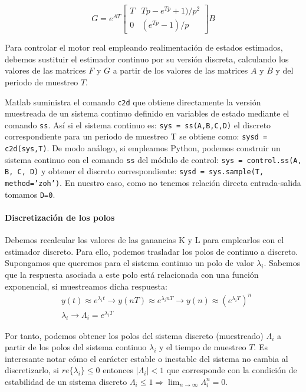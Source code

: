 \documentclass[10pt,a4paper]{report}
\begin{document}
\begin{equation}
	G = e^{AT}\begin{bmatrix}
		T & Tp-e^{Tp}+1)/p^2\\
		0 &(e^{Tp}-1)/p
	\end{bmatrix}B
\end{equation}



Para controlar el motor real empleando realimentación de estados estimados, debemos sustituir el estimador continuo por su versión discreta, calculando los valores de las matrices $F$ y $G$ a partir de los valores de las matrices $A$ y $B$ y del periodo de muestreo $T$. 

Matlab suministra el comando \texttt{c2d} que obtiene directamente la versión muestreada de un sistema continuo definido en variables de estado mediante el comando \texttt{ss}. Así si el sistema continuo es: \texttt{sys = ss(A,B,C,D)} el discreto correspondiente para un periodo de muestreo T se obtiene como: \texttt{sysd = c2d(sys,T)}. De modo análogo, si empleamos Python, podemos construir un sistema continuo con el comando \texttt{ss} del módulo de control: \texttt{sys = control.ss(A, B, C, D)} y obtener el discreto correspondiente: \texttt{sysd = sys.sample(T, method='zoh')}. En nuestro caso, como no tenemos relación directa entrada-salida tomamos \texttt{D=0}.

\paragraph{Discretización de los polos} Debemos recalcular los valores de las ganancias K y L para emplearlos con el estimador discreto. Para ello, podemos trasladar los polos de continuo a discreto. Supongamos que queremos para el sistema continuo un polo de valor $\lambda_i$. Sabemos que la respuesta asociada a este polo está relacionada con una función exponencial, si muestreamos dicha respuesta:
\begin{align}
&y(t) \approx e^{\lambda_it} \rightarrow y(nT) \approx e^{\lambda_inT} \rightarrow y(n) \approx \left(e^{\lambda_iT}\right)^n\\
&\lambda_i \rightarrow  \Lambda_i = e^{\lambda_iT} \label{eq416}
\end{align}

Por tanto, podemos obtener los polos del sistema discreto (muestreado) $\Lambda_i$ a partir de los polos del sistema continuo $\lambda_i$ y el tiempo de muestreo $T$. Es interesante notar cómo el carácter estable o inestable del sistema no cambia al discretizarlo, si $re\{\lambda_i\} \le 0$ entonces $|\Lambda_i| < 1$ que corresponde con la condición de estabilidad de un sistema discreto $\Lambda_i \le 1 \Rightarrow  \lim_{n\rightarrow \infty} \Lambda_i^n =0$.
\end{document}
